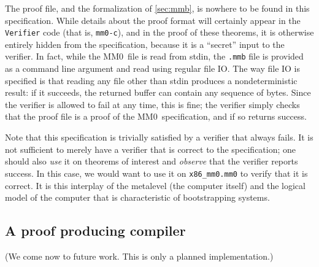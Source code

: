 \documentclass[runningheads]{llncs}
\newcommand{\mmO}{\textsf{MM0}}
\begin{document}
The proof file, and the formalization of \autoref{sec:mmb}, is nowhere to be found in this specification. While details about the proof format will certainly appear in the \texttt{Verifier} code (that is, \texttt{mm0-c}), and in the proof of these theorems, it is otherwise entirely hidden from the specification, because it is a ``secret'' input to the verifier. In fact, while the \mmO\ file is read from \textsf{stdin}, the \texttt{.mmb} file is provided as a command line argument and read using regular file IO. The way file IO is specified is that reading any file other than \textsf{stdin} produces a nondeterministic result: if it succeeds, the returned buffer can contain any sequence of bytes. Since the verifier is allowed to fail at any time, this is fine; the verifier simply checks that the proof file is a proof of the \mmO\ specification, and if so returns success.

Note that this specification is trivially satisfied by a verifier that always fails. It is not sufficient to merely have a verifier that is correct to the specification; one should also \emph{use} it on theorems of interest and \emph{observe} that the verifier reports success. In this case, we would want to use it on \texttt{x86\_mm0.mm0} to verify that it is correct. It is this interplay of the metalevel (the computer itself) and the logical model of the computer that is characteristic of bootstrapping systems.

\subsection{A proof producing compiler}
(We come now to future work. This is only a planned implementation.)
\end{document}
